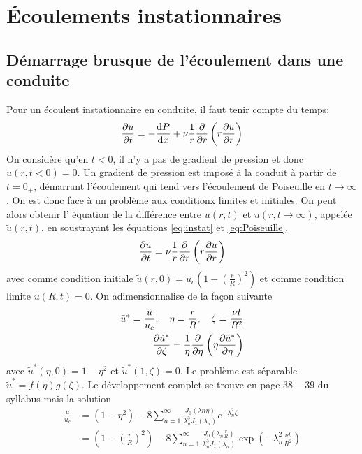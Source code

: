   \section{Écoulements instationnaires}
    \subsection{Démarrage brusque de l'écoulement dans une conduite}
      Pour un écoulent instationnaire en conduite, il faut tenir compte du temps:
      \begin{equation}
        \pdv{u}{t} = -\dv{P}{x} + \nu \frac{1}{r} \pdv{r} \left(r\pdv{u}{r}\right) \label{eq:instat}
      \end{equation}
      On considère qu'en $t<0$, il n'y a pas de gradient de pression et donc $u(r, t<0) = 0$. Un gradient de pression est imposé à la conduit à partir de $t=0_+$, démarrant l'écoulement qui tend vers l'écoulement de Poiseuille en $t \rightarrow \infty$. On est donc face à un problème aux conditionx limites et initiales. On peut alors obtenir l' équation de la différence entre $u(r, t)$ et $u(r, t\rightarrow\infty)$, appelée $\tilde{u}(r,t)$, en soustrayant les équations \ref{eq:instat} et \ref{eq:Poiseuille}.
      \begin{equation}
        \pdv{\tilde{u}}{t} = \nu \frac{1}{r} \pdv{r} \left(r\pdv{\tilde{u}}{r}\right)
      \end{equation}
      avec comme condition initiale $\tilde{u}(r,0)=u_c\left(1-\left(\frac{r}{R}\right)^2\right)$ et comme condition limite $\tilde{u}(R,t)=0$. On adimensionnalise de la façon suivante
      \begin{equation}
        \begin{aligned}
          \tilde{u}^\ast = \frac{\tilde{u}}{u_c}, \quad \eta = \frac{r}{R}, \quad \zeta = \frac{\nu t}{R^2}\\
          \pdv{\tilde{u}^\ast}{\zeta} = \frac{1}{\eta}\pdv{\eta}\left(\eta\pdv{\tilde{u}^\ast}{\eta}\right)
        \end{aligned}
      \end{equation}
      avec $\tilde{u}^\ast(\eta,0) = 1-\eta^2$ et $\tilde{u}^\ast(1, \zeta) = 0$. Le problème est séparable $\tilde{u}^\ast = f(\eta)g(\zeta)$. Le développement complet se trouve en page $38-39$ du syllabus mais la solution
      \begin{equation}
        \begin{aligned}
          \frac{u}{u_c} &= (1-\eta^2) - 8 \sum^\infty_{n=1} \frac{J_0(\lambda{n}\eta)}{\lambda_n^3 J_1(\lambda_n)}e^{-\lambda_n^2 \zeta}\\
          &= \left(1- \left(\frac{r}{R}\right)^2\right) - 8 \sum^\infty_{n=1} \frac{J_0\left(\lambda_n \frac{r}{R}\right)}{\lambda_n^3 J_1(\lambda_n)} \exp(-\lambda_n^2 \frac{\nu t}{R^2})
        \end{aligned}
      \end{equation}

